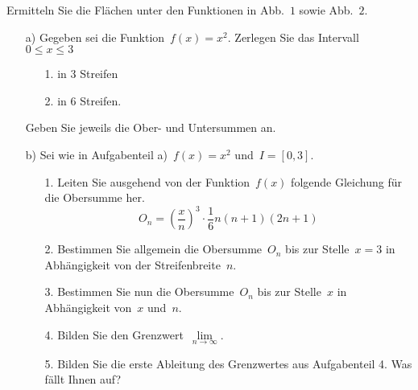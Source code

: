 


Ermitteln Sie die Flächen unter den Funktionen in Abb.~$1$ sowie Abb.~$2$.
\begin{figure}[h]
	\centering
		\def\svgwidth{0.3\textwidth}
		\hfil
		\def\svgwidth{0.3\textwidth}
\end{figure}

\begin{itemize}
\item[a)] Gegeben sei die Funktion~$f(x)=x^2$. Zerlegen Sie das Intervall~$0 \leq x \leq 3$
	\begin{itemize}
		\item[1.] in 3 Streifen
		\item[2.] in 6 Streifen.
	\end{itemize}
Geben Sie jeweils die Ober- und Untersummen an.
\item[b)] Sei wie in Aufgabenteil a)~$f(x)=x^2$ und~$I=\left[0,3\right]$.
	\begin{itemize}
		\item[1.] Leiten Sie ausgehend von der Funktion~$f(x)$ folgende Gleichung für die Obersumme her.
		\begin{equation*}
			O_n = \left(\frac{x}{n}\right)^3 \cdot \frac{1}{6} n \left(n + 1\right)\left(2n + 1\right)
		\end{equation*}
		\item[2.] Bestimmen Sie allgemein die Obersumme~$O_n$ bis zur Stelle~$x=3$ in Abhängigkeit von der Streifenbreite~$n$.
		\item[3.] Bestimmen Sie nun die Obersumme~$O_n$ bis zur Stelle~$x$ in Abhängigkeit von~$x$ und~$n$.
		\item[4.] Bilden Sie den Grenzwert~$\lim\limits_{n \to \infty}$.
		\item[5.] Bilden Sie die erste Ableitung des Grenzwertes aus Aufgabenteil 4. Was fällt Ihnen auf?
	\end{itemize}
\end{itemize}
